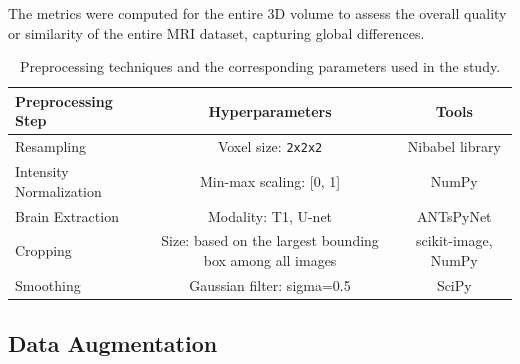 The metrics were computed for the entire 3D volume to assess the overall quality or similarity of the entire MRI dataset, capturing global differences.
\begin{center}
    \begin{table}
        \centering
        \caption{\label{tab:preprocessing_pipeline}Preprocessing techniques and the corresponding parameters used in the study.}
        \begin{tabular*}{500pt}{@{\extracolsep\fill}lcc@{\extracolsep\fill}}
            \toprule
            \textbf{Preprocessing Step} & \textbf{Hyperparameters} & \textbf{Tools} \\
            \midrule
            Resampling & Voxel size: \texttt{2x2x2} & Nibabel library \\
            Intensity Normalization & Min-max scaling: [0, 1] & NumPy \\
            Brain Extraction & Modality: T1, U-net & ANTsPyNet \\
            Cropping & Size: based on the largest bounding box among all images & scikit-image, NumPy \\
            Smoothing & Gaussian filter: sigma=0.5 & SciPy \\
            \bottomrule
            \end{tabular*}
    \end{table}
\end{center}
%
\subsection{Data Augmentation}

